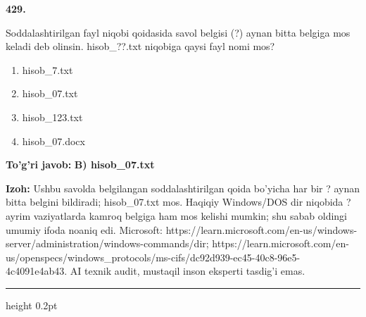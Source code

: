 \documentclass[10pt,a4paper]{article}
\begin{document}
{\bfseries\sffamily\color{ink} 429.}
\par
Soddalashtirilgan fayl niqobi qoidasida savol belgisi (?) aynan bitta belgiga mos keladi deb olinsin. hisob\_??.txt niqobiga qaysi fayl nomi mos?
\begin{enumerate}[label=\Alph*),leftmargin=9mm]
\item hisob\_7.txt
\item hisob\_07.txt
\item hisob\_123.txt
\item hisob\_07.docx
\end{enumerate}
\begin{tcolorbox}[enhanced,breakable,colback=teal!4,colframe=teal!60!black,boxrule=0.45pt,arc=1.2mm,left=2.7mm,right=2.7mm,top=1.8mm,bottom=1.8mm,before skip=2mm,after skip=2mm]
{\bfseries\sffamily\color{teal}To'g'ri javob:} \textbf{B) hisob\_07.txt}
\par\smallskip
{\bfseries Izoh:} Ushbu savolda belgilangan soddalashtirilgan qoida bo'yicha har bir ? aynan bitta belgini bildiradi; hisob\_07.txt mos. Haqiqiy Windows/DOS dir niqobida ? ayrim vaziyatlarda kamroq belgiga ham mos kelishi mumkin; shu sabab oldingi umumiy ifoda noaniq edi. Microsoft: https://learn.microsoft.com/en-us/windows-server/administration/windows-commands/dir; https://learn.microsoft.com/en-us/openspecs/windows\_protocols/ms-cifs/dc92d939-ec45-40c8-96e5-4c4091e4ab43. AI texnik audit, mustaqil inson eksperti tasdig'i emas.
\end{tcolorbox}
\vspace{2mm}\hrule height 0.2pt\vspace{3mm}
\end{document}

